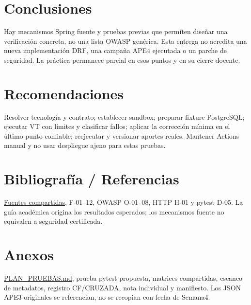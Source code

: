 \documentclass[11pt,a4paper]{article}
\begin{document}
\section{Conclusiones}\label{APE4-semana-4-conclusiones}

Hay mecanismos Spring fuente y pruebas previas que permiten diseñar una
verificación concreta, no una lista OWASP genérica. Esta entrega no
acredita una nueva implementación DRF, una campaña APE4 ejecutada o un
parche de seguridad. La práctica permanece parcial en esos puntos y en
su cierre docente.

\section{Recomendaciones}\label{APE4-semana-4-recomendaciones}

Resolver tecnología y contrato; establecer sandbox; preparar fixture
PostgreSQL; ejecutar VT con límites y clasificar fallos; aplicar la
corrección mínima en el último punto confiable; reejecutar y versionar
aportes reales. Mantener Actions manual y no usar despliegue ajeno para
estas pruebas.

\section{Bibliografía /
Referencias}\label{APE4-semana-4-bibliografuxeda--referencias}

\href{../soporte-semanas-4-5/FUENTES.md}{Fuentes compartidas}, F-01--12,
OWASP O-01--08, HTTP H-01 y pytest D-05. La guía académica origina los
resultados esperados; los mecanismos fuente no equivalen a seguridad
certificada.

\nocite{*}


\section{Anexos}\label{APE4-semana-4-anexos}

\url{PLAN_PRUEBAS.md}, prueba pytest propuesta, matrices compartidas,
escaneo de metadatos, registro CF/CRUZADA, nota individual y manifiesto.
Los JSON APE3 originales se referencian, no se recopian con fecha de
Semana4.
\end{document}
